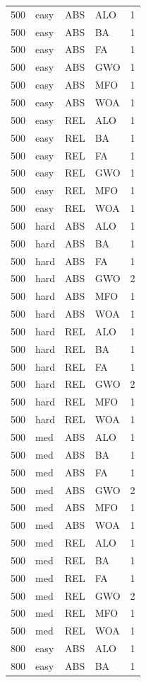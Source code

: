 \begin{tabular}{r l l l l}
500 & easy & ABS & ALO & 1 \\
500 & easy & ABS & BA & 1 \\
500 & easy & ABS & FA & 1 \\
500 & easy & ABS & GWO & 1 \\
500 & easy & ABS & MFO & 1 \\
500 & easy & ABS & WOA & 1 \\
500 & easy & REL & ALO & 1 \\
500 & easy & REL & BA & 1 \\
500 & easy & REL & FA & 1 \\
500 & easy & REL & GWO & 1 \\
500 & easy & REL & MFO & 1 \\
500 & easy & REL & WOA & 1 \\
500 & hard & ABS & ALO & 1 \\
500 & hard & ABS & BA & 1 \\
500 & hard & ABS & FA & 1 \\
500 & hard & ABS & GWO & 2 \\
500 & hard & ABS & MFO & 1 \\
500 & hard & ABS & WOA & 1 \\
500 & hard & REL & ALO & 1 \\
500 & hard & REL & BA & 1 \\
500 & hard & REL & FA & 1 \\
500 & hard & REL & GWO & 2 \\
500 & hard & REL & MFO & 1 \\
500 & hard & REL & WOA & 1 \\
500 & med & ABS & ALO & 1 \\
500 & med & ABS & BA & 1 \\
500 & med & ABS & FA & 1 \\
500 & med & ABS & GWO & 2 \\
500 & med & ABS & MFO & 1 \\
500 & med & ABS & WOA & 1 \\
500 & med & REL & ALO & 1 \\
500 & med & REL & BA & 1 \\
500 & med & REL & FA & 1 \\
500 & med & REL & GWO & 2 \\
500 & med & REL & MFO & 1 \\
500 & med & REL & WOA & 1 \\
800 & easy & ABS & ALO & 1 \\
800 & easy & ABS & BA & 1 \\

\end{tabular}
